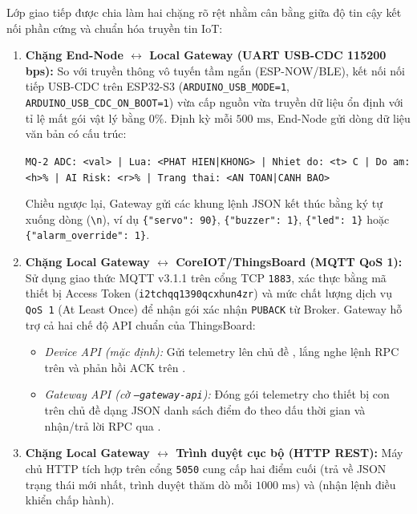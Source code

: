 Lớp giao tiếp được chia làm hai chặng rõ rệt nhằm cân bằng giữa độ tin cậy kết nối phần cứng và chuẩn hóa truyền tin IoT:

\begin{enumerate}[leftmargin=*, itemsep=3pt]
  \item \textbf{Chặng End-Node $\leftrightarrow$ Local Gateway (UART USB-CDC 115200 bps):} So với truyền thông vô tuyến tầm ngắn (ESP-NOW/BLE), kết nối nối tiếp USB-CDC trên ESP32-S3 (\texttt{ARDUINO\_USB\_MODE=1}, \texttt{ARDUINO\_USB\_CDC\_ON\_BOOT=1}) vừa cấp nguồn vừa truyền dữ liệu ổn định với tỉ lệ mất gói vật lý bằng $0\%$. Định kỳ mỗi $500\text{ ms}$, End-Node gửi dòng dữ liệu văn bản có cấu trúc:
  \begin{center}
    \texttt{MQ-2 ADC: <val> | Lua: <PHAT HIEN|KHONG> | Nhiet do: <t> C | Do am: <h>\% | AI Risk: <r>\% | Trang thai: <AN TOAN|CANH BAO>}
  \end{center}
  Chiều ngược lại, Gateway gửi các khung lệnh JSON kết thúc bằng ký tự xuống dòng (\texttt{\textbackslash n}), ví dụ \texttt{\{"servo": 90\}}, \texttt{\{"buzzer": 1\}}, \texttt{\{"led": 1\}} hoặc \texttt{\{"alarm\_override": 1\}}.
  \item \textbf{Chặng Local Gateway $\leftrightarrow$ CoreIOT/ThingsBoard (MQTT QoS 1):} Sử dụng giao thức MQTT v3.1.1 \cite{ref_mqtt} trên cổng TCP \texttt{1883}, xác thực bằng mã thiết bị Access Token (\texttt{i2tchqq1390qcxhun4zr}) và mức chất lượng dịch vụ \texttt{QoS 1} (At Least Once) để nhận gói xác nhận \texttt{PUBACK} từ Broker. Gateway hỗ trợ cả hai chế độ API chuẩn của ThingsBoard:
  \begin{itemize}[leftmargin=*, itemsep=2pt]
    \item \textit{Device API (mặc định):} Gửi telemetry lên chủ đề , lắng nghe lệnh RPC trên  và phản hồi ACK trên .
    \item \textit{Gateway API (cờ \texttt{--gateway-api}):} Đóng gói telemetry cho thiết bị con  trên chủ đề  dạng JSON danh sách điểm đo theo dấu thời gian và nhận/trả lời RPC qua .
  \end{itemize}
  \item \textbf{Chặng Local Gateway $\leftrightarrow$ Trình duyệt cục bộ (HTTP REST):} Máy chủ HTTP tích hợp trên cổng \texttt{5050} cung cấp hai điểm cuối  (trả về JSON trạng thái mới nhất, trình duyệt thăm dò mỗi $1000\text{ ms}$) và  (nhận lệnh điều khiển chấp hành).
\end{enumerate}

